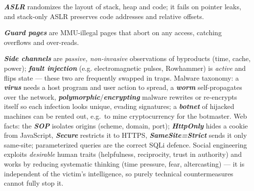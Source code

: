\documentclass[12pt, a4paper]{article}
\newcommand{\term}[1]{\textbf{\textit{#1}}}        %
\begin{document}
\term{ASLR} randomizes the layout of stack, heap and code; it fails on pointer leaks, and stack-only ASLR preserves code addresses and relative offsets.

\term{Guard pages} are MMU-illegal pages that abort on any access, catching overflows and over-reads.

\term{Side channels} are \emph{passive, non-invasive} observations of byproducts (time, cache, power); \term{fault injection} (e.g. electromagnetic pulses, Rowhammer) is \emph{active} and flips state --- these two are frequently swapped in traps.
Malware taxonomy: a \term{virus} needs a host program and user action to spread, a \term{worm} self-propagates over the network, \term{polymorphic}/\term{encrypting} malware rewrites or re-encrypts itself so each infection looks unique, evading signatures; a \term{botnet} of hijacked machines can be rented out, e.g.\ to mine cryptocurrency for the botmaster.
Web facts: the \term{SOP} isolates origins (scheme, domain, port); \term{HttpOnly} hides a cookie from JavaScript, \term{Secure} restricts it to HTTPS, \term{SameSite=Strict} sends it only same-site; parameterized queries are the correct SQLi defence.
Social engineering exploits \emph{desirable} human traits (helpfulness, reciprocity, trust in authority) and works by reducing systematic thinking (time pressure, fear, altercasting) --- it is independent of the victim's intelligence, so purely technical countermeasures cannot fully stop it.
\end{document}
